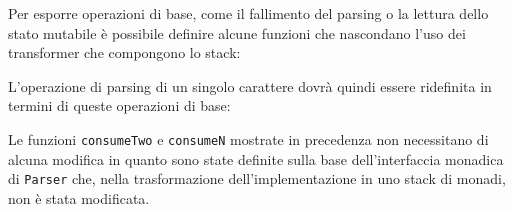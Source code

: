 Per esporre operazioni di base, come il fallimento del parsing o la lettura dello stato mutabile è possibile definire alcune funzioni che nascondano l'uso dei transformer che compongono lo stack:

L'operazione di parsing di un singolo carattere dovrà quindi essere ridefinita in termini di queste operazioni di base:

Le funzioni \lstinline{consumeTwo} e \lstinline{consumeN} mostrate in precedenza non necessitano di alcuna modifica in quanto sono state definite sulla base dell'interfaccia monadica di \lstinline{Parser} che, nella trasformazione dell'implementazione in uno stack di monadi, non è stata modificata.
